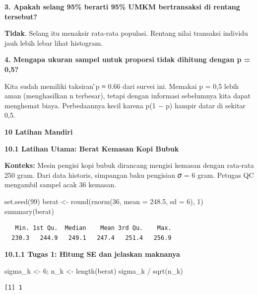 \documentclass[
  indonesian,
  letterpaper,
]{book}
\newenvironment{Shaded}{\begin{snugshade}}{\end{snugshade}}
\newcommand{\AttributeTok}[1]{\textcolor[rgb]{0.40,0.45,0.13}{#1}}
\newcommand{\DecValTok}[1]{\textcolor[rgb]{0.68,0.00,0.00}{#1}}
\newcommand{\FloatTok}[1]{\textcolor[rgb]{0.68,0.00,0.00}{#1}}
\newcommand{\FunctionTok}[1]{\textcolor[rgb]{0.28,0.35,0.67}{#1}}
\newcommand{\NormalTok}[1]{\textcolor[rgb]{0.00,0.23,0.31}{#1}}
\newcommand{\OtherTok}[1]{\textcolor[rgb]{0.00,0.23,0.31}{#1}}
\newcommand{\SpecialCharTok}[1]{\textcolor[rgb]{0.37,0.37,0.37}{#1}}
\begin{document}
\textbf{3. Apakah selang 95\% berarti 95\% UMKM bertransaksi di rentang
tersebut?}

\textbf{Tidak}. Selang itu menaksir rata-rata populasi. Rentang nilai
transaksi individu jauh lebih lebar lihat histogram.

\textbf{4. Mengapa ukuran sampel untuk proporsi tidak dihitung dengan p
= 0,5?}

Kita sudah memiliki taksiran ̂p ≈ 0.66 dari survei ini. Memakai p = 0,5
lebih aman (menghasilkan n terbesar), tetapi dengan informasi sebelumnya
kita dapat menghemat biaya. Perbedaannya kecil karena p(1 − p) hampir
datar di sekitar 0,5.

\textbf{10 Latihan Mandiri}

\textbf{10.1 Latihan Utama: Berat Kemasan Kopi Bubuk}

\textbf{Konteks:} Mesin pengisi kopi bubuk dirancang mengisi kemasan
dengan rata-rata 250 gram. Dari data historis, simpangan baku pengisian
𝜎 = 6 gram. Petugas QC mengambil sampel acak 36 kemasan.

\begin{Shaded}
\begin{Highlighting}[]
\FunctionTok{set.seed}\NormalTok{(}\DecValTok{99}\NormalTok{)}
\NormalTok{berat }\OtherTok{\textless{}{-}} \FunctionTok{round}\NormalTok{(}\FunctionTok{rnorm}\NormalTok{(}\DecValTok{36}\NormalTok{, }\AttributeTok{mean =} \FloatTok{248.5}\NormalTok{, }\AttributeTok{sd =} \DecValTok{6}\NormalTok{), }\DecValTok{1}\NormalTok{)}
\FunctionTok{summary}\NormalTok{(berat)}
\end{Highlighting}
\end{Shaded}

\begin{verbatim}
   Min. 1st Qu.  Median    Mean 3rd Qu.    Max. 
  230.3   244.9   249.1   247.4   251.4   256.9 
\end{verbatim}

\textbf{10.1.1 Tugas 1: Hitung SE dan jelaskan maknanya}

\begin{Shaded}
\begin{Highlighting}[]
\NormalTok{sigma\_k }\OtherTok{\textless{}{-}} \DecValTok{6}\NormalTok{; n\_k }\OtherTok{\textless{}{-}} \FunctionTok{length}\NormalTok{(berat)}
\NormalTok{sigma\_k }\SpecialCharTok{/} \FunctionTok{sqrt}\NormalTok{(n\_k)}
\end{Highlighting}
\end{Shaded}

\begin{verbatim}
[1] 1
\end{verbatim}
\end{document}
